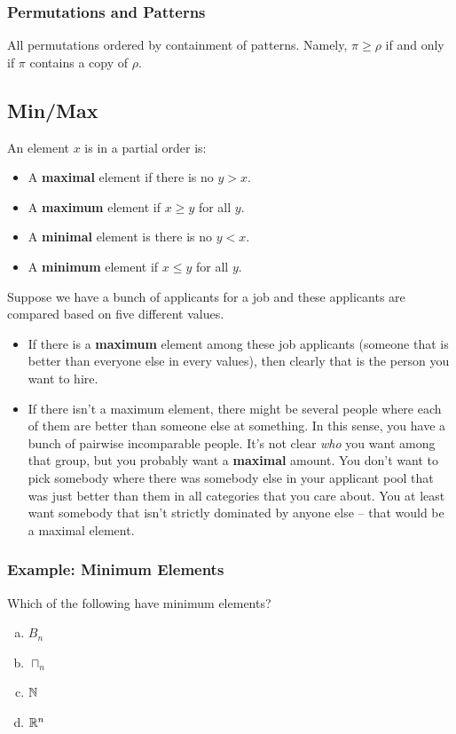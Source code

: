 \documentclass[letterpaper]{article}
\begin{document}
\subsubsection{Permutations and Patterns}
All permutations ordered by containment of patterns. Namely, $\pi \geq \rho$ if and only if $\pi$ contains a copy of $\rho$. 


\subsection{Min/Max}
\begin{definition}{}{}
    An element $x$ is in a partial order is:
    \begin{itemize}
        \item A \textbf{maximal} element if there is no $y > x$. 
        \item A \textbf{maximum} element if $x \geq y$ for all $y$. 
        \item A \textbf{minimal} element is there is no $y < x$. 
        \item A \textbf{minimum} element if $x \leq y$ for all $y$. 
    \end{itemize}
\end{definition}
Suppose we have a bunch of applicants for a job and these applicants are compared based on five different values. 
\begin{itemize}
    \item If there is a \textbf{maximum} element among these job applicants (someone that is better than everyone else in every values), then clearly that is the person you want to hire.
    \item If there isn't a maximum element, there might be several people where each of them are better than someone else at something. In this sense, you have a bunch of pairwise incomparable people. It's not clear \emph{who} you want among that group, but you probably want a \textbf{maximal} amount. You don't want to pick somebody where there was somebody else in your applicant pool that was just better than them in all categories that you care about. You at least want somebody that isn't strictly dominated by anyone else -- that would be a maximal element.
\end{itemize} 

\subsubsection{Example: Minimum Elements}
Which of the following have minimum elements? 
\begin{enumerate}[(a)]
    \item $B_n$
    \item $\sqcap_n$
    \item $\mathbb{N}$
    \item $\mathbb{R}^n$
\end{enumerate}
\end{document}
